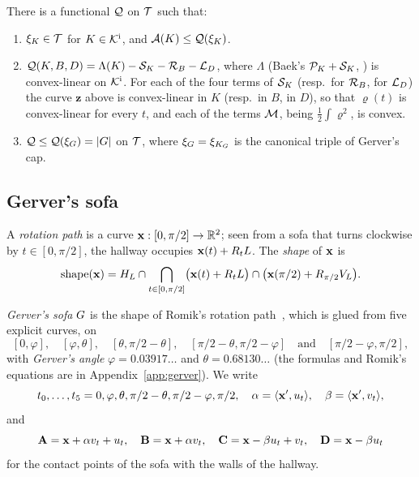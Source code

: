 \begin{fact}\label{fact:Q}
There is a functional $\mathcal{Q}$ on $\mathcal{T}$ such that:
\begin{enumerate}[label=(\alph*)]
\item\label{fact:Q:triple} $\xi_K\in\mathcal{T}$ for $K\in\mathcal{K}^{\mathrm{i}}$, and
$\mathcal{A}(K)\le\mathcal{Q}(\xi_K)$. 
\item\label{fact:Q:decomp} $\mathcal{Q}(K,B,D)=\Lambda(K)-\mathcal{S}_K-\mathcal{R}_B-\mathcal{L}_D$, where
$\Lambda$ (Baek's $\mathcal{P}_K+\mathcal{S}_K$, ) is convex-linear on $\mathcal{K}^{\mathrm{i}}$.
For each of the four terms of $\mathcal{S}_K$ (resp.\ for $\mathcal{R}_B$, for $\mathcal{L}_D$) the
curve $\mathbf z$ above is convex-linear in $K$ (resp.\ in $B$, in $D$), so that
$\varrho(t)$ is convex-linear for every $t$, and each of the terms $\mathcal{M}$, being
$\frac12\int\varrho^2$, is convex. 
\item\label{fact:Q:max} $\mathcal{Q}\le\mathcal{Q}(\xi_G)=\lvert G\rvert$ on $\mathcal{T}$, where
$\xi_G=\xi_{K_G}$ is the canonical triple of Gerver's cap. 
\end{enumerate}
\end{fact}

\subsection{Gerver's sofa}\label{sec:gerver}

\begin{definition}\label{def:shape}
A \emph{rotation path} is a curve $\mathbf{x}:[0,\pi/2]\to\mathbb{R}^2$; seen from a sofa that
turns clockwise by $t\in[0,\pi/2]$, the hallway occupies $\mathbf{x}(t)+R_tL$. The
\emph{shape} of $\mathbf{x}$ is
\[
  \operatorname{shape}(\mathbf{x})=H_L\cap\bigcap_{t\in[0,\pi/2]}\bigl(\mathbf{x}(t)
    +R_tL\bigr)\cap\bigl(\mathbf{x}(\pi/2)+R_{\pi/2}V_L\bigr).
\]
\end{definition}

\begin{definition}\label{def:gerver}
\emph{Gerver's sofa} $G$ is the shape of Romik's rotation path~\cite{Romik18},
which is glued from five explicit curves, on
\[
  [0,\varphi],\quad[\varphi,\theta],\quad[\theta,\pi/2-\theta],\quad
  [\pi/2-\theta,\pi/2-\varphi]\quad\text{and}\quad[\pi/2-\varphi,\pi/2],
\]
with \emph{Gerver's angle} $\varphi=0.03917\ldots$ and $\theta=0.68130\ldots$
(the formulas and Romik's equations are in Appendix~\ref{app:gerver}). We write
\[
  t_0,\dots,t_5=0,\varphi,\theta,\pi/2-\theta,\pi/2-\varphi,\pi/2,\quad
  \alpha=\langle \mathbf{x}',u_t\rangle,\quad \beta=\langle \mathbf{x}',v_t\rangle,
\]
and
\[
  \mathbf{A}=\mathbf{x}+\alpha v_t+u_t,\quad \mathbf{B}=\mathbf{x}+\alpha v_t,\quad \mathbf{C}=\mathbf{x}-\beta u_t+v_t,
    \quad \mathbf{D}=\mathbf{x}-\beta u_t
\]
for the contact points of the sofa with the walls of the hallway.
\end{definition}

